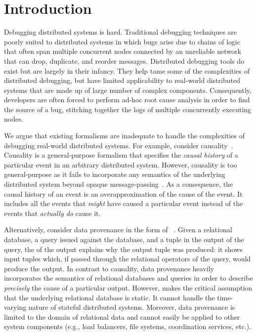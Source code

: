 \section{Introduction}
Debugging distributed systems is hard. Traditional debugging techniques are
poorly suited to distributed systems in which bugs arise due to chains of logic
that often span multiple concurrent nodes connected by an unreliable network that can
drop, duplicate, and reorder messages. Distributed debugging tools do
exist but are largely in their infancy. They help tame some of the complexities
of distributed debugging, but have limited applicability to real-world
distributed systems that are made up of large number of complex components.
Consequently, developers are often forced to perform ad-hoc root cause analysis
in order to find the source of a bug, stitching together the logs of multiple
concurrently executing nodes.

We argue that existing formalisms are inadequate to handle the complexities of
debugging real-world distributed systems. For example, consider
causality~\cite{lamport1978time}.  Causality is a general-purpose formalism
that specifies the \emph{causal history} of a particular event in an arbitrary
distributed system. However, causality is too general-purpose as it fails to
incorporate any semantics of the underlying distributed system beyond opaque
message-passing~\cite{bailis2012potential}. As a consequence, the causal
history of an event is an overapproximation of the cause of the event. It
includes all the events that \emph{might} have caused a particular event
instead of the events that \emph{actually do} cause it.

Alternatively, consider data provenance in the form of
\emph{\whyprovenance{}}~\cite{cheney2009provenance, buneman2001and}. Given a
relational database, a query issued against the database, and a tuple in the
output of the query, the \whyprovenance{} of the output explains why the output
tuple was produced: it shows input tuples which, if passed through the
relational operators of the query, would produce the output. In contrast to
causality, data provenance heavily incorporates the semantics of relational
databases and queries in order to describe \emph{precisely} the cause of a
particular output. However, makes the critical assumption that the underlying
relational database is static. It cannot handle the time-varying nature of
stateful distributed systems. Moreover, data provenance is limited to the
domain of relational data and cannot easily be applied to other system
components (e.g., load balancers, file systems, coordination services, etc.).

